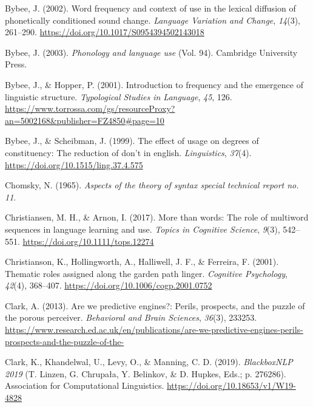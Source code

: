 \documentclass[
  12pt,
  letterpaper,
]{scrreprt}
\newlength{\cslhangindent}
\newenvironment{CSLReferences}[2] %
 {\begin{list}{}{%
  \setlength{\itemindent}{0pt}
  \setlength{\leftmargin}{0pt}
  \setlength{\parsep}{0pt}
  \ifodd #1
   \setlength{\leftmargin}{\cslhangindent}
   \setlength{\itemindent}{-1\cslhangindent}
  \fi
  \setlength{\itemsep}{#2\baselineskip}}}
 {\end{list}}
\begin{document}
\begin{CSLReferences}{1}{0}
Bybee, J. (2002). Word frequency and context of use in the lexical
diffusion of phonetically conditioned sound change. \emph{Language
Variation and Change}, \emph{14}(3), 261--290.
\url{https://doi.org/10.1017/S0954394502143018}

Bybee, J. (2003). \emph{Phonology and language use} (Vol. 94). Cambridge
University Press.

Bybee, J., \& Hopper, P. (2001). Introduction to frequency and the
emergence of linguistic structure. \emph{Typological Studies in
Language}, \emph{45}, 126.
\url{https://www.torrossa.com/gs/resourceProxy?an=5002168&publisher=FZ4850\#page=10}

Bybee, J., \& Scheibman, J. (1999). The effect of usage on degrees of
constituency: The reduction of don't in english. \emph{Linguistics},
\emph{37}(4). \url{https://doi.org/10.1515/ling.37.4.575}

Chomsky, N. (1965). \emph{Aspects of the theory of syntax special
technical report no. 11}.

Christiansen, M. H., \& Arnon, I. (2017). More than words: The role of
multiword sequences in language learning and use. \emph{Topics in
Cognitive Science}, \emph{9}(3), 542--551.
\url{https://doi.org/10.1111/tops.12274}

Christianson, K., Hollingworth, A., Halliwell, J. F., \& Ferreira, F.
(2001). Thematic roles assigned along the garden path linger.
\emph{Cognitive Psychology}, \emph{42}(4), 368--407.
\url{https://doi.org/10.1006/cogp.2001.0752}

Clark, A. (2013). Are we predictive engines?: Perils, prospects, and the
puzzle of the porous perceiver. \emph{Behavioral and Brain Sciences},
\emph{36}(3), 233253.
\url{https://www.research.ed.ac.uk/en/publications/are-we-predictive-engines-perils-prospects-and-the-puzzle-of-the-}

Clark, K., Khandelwal, U., Levy, O., \& Manning, C. D. (2019).
\emph{BlackboxNLP 2019} (T. Linzen, G. Chrupała, Y. Belinkov, \& D.
Hupkes, Eds.; p. 276286). Association for Computational Linguistics.
\url{https://doi.org/10.18653/v1/W19-4828}


\end{CSLReferences}
\end{document}
